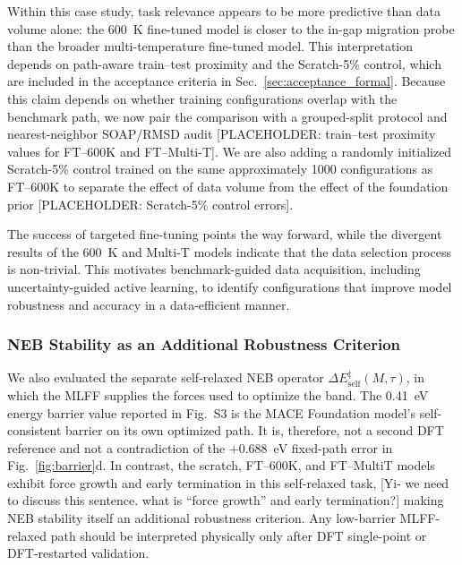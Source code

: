 \documentclass[pdflatex,sn-mathphys-num]{sn-jnl}%
\providecommand{\reviewermap}[3]{}
\theoremstyle{thmstyleone}%
\theoremstyle{thmstyletwo}%
\theoremstyle{thmstylethree}%
\begin{document}

Within this case study, task relevance appears to be more predictive than data volume alone: the 600~K fine-tuned model is closer to the in-gap migration probe than the broader multi-temperature fine-tuned model. This interpretation depends on path-aware train--test proximity and the Scratch-5\% control, which are included in the acceptance criteria in Sec.~\ref{sec:acceptance_formal}. Because this claim depends on whether training configurations overlap with the benchmark path, we now pair the comparison with a grouped-split protocol and nearest-neighbor SOAP/RMSD audit [PLACEHOLDER: train--test proximity values for FT--600K and FT--Multi-T]. We are also adding a randomly initialized Scratch-5\% control trained on the same approximately 1000 configurations as FT--600K to separate the effect of data volume from the effect of the foundation prior [PLACEHOLDER: Scratch-5\% control errors].

The success of targeted fine-tuning points the way forward, while the divergent results of the 600~K and Multi-T models indicate that the data selection process is non-trivial. This motivates benchmark-guided data acquisition, including uncertainty-guided active learning, to identify configurations that improve model robustness and accuracy in a data-efficient manner.


\subsubsection{NEB Stability as an Additional Robustness Criterion}
\reviewermap{REV-A1}{partial}{Define Fig. 3d and SI Fig. S3 as different NEB operators and report them side-by-side.}

We also evaluated the separate self-relaxed NEB operator $\Delta E_{\mathrm{self}}^{\ddagger}(M,\tau)$, in which the MLFF supplies the forces used to optimize the band. The 0.41~eV energy barrier value reported in Fig.~S3 is the MACE Foundation model's self-consistent barrier on its own optimized path. It is, therefore, not a second DFT reference and not a contradiction of the +0.688~eV fixed-path error in Fig.~\ref{fig:barrier}d. In contrast, the scratch, FT--600K, and FT--MultiT models exhibit force growth and early termination in this self-relaxed task, [Yi- we need to discuss this sentence. what is ``force growth'' and early termination?] making NEB stability itself an additional robustness criterion. Any low-barrier MLFF-relaxed path should be interpreted physically only after DFT single-point or DFT-restarted validation.
\end{document}

